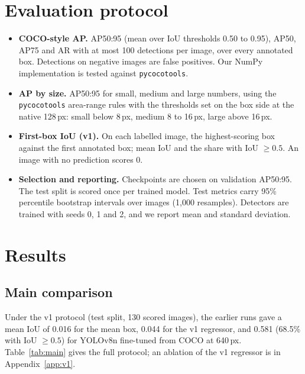 \documentclass[10pt,a4paper]{article}
\begin{document}
\section{Evaluation protocol}

\begin{itemize}
  \item \textbf{COCO-style AP.} AP50:95 (mean over IoU thresholds 0.50 to 0.95), AP50, AP75 and
    AR with at most 100 detections per image, over every annotated box. Detections on negative
    images are false positives. Our NumPy implementation is tested against \texttt{pycocotools}.
  \item \textbf{AP by size.} AP50:95 for small, medium and large numbers, using the
    \texttt{pycocotools} area-range rules with the thresholds set on the box side at the native
    128\,px: small below 8\,px, medium 8 to 16\,px, large above 16\,px.
  \item \textbf{First-box IoU (v1).} On each labelled image, the highest-scoring box against the
    first annotated box; mean IoU and the share with IoU $\geq 0.5$. An image with no prediction
    scores 0.
  \item \textbf{Selection and reporting.} Checkpoints are chosen on validation AP50:95. The test
    split is scored once per trained model. Test metrics carry 95\% percentile bootstrap
    intervals over images (1,000 resamples). Detectors are trained with seeds 0, 1 and 2, and we
    report mean and standard deviation.
\end{itemize}

\section{Results}

\subsection{Main comparison}

Under the v1 protocol (test split, 130 scored images), the earlier runs gave a mean IoU of 0.016
for the mean box, 0.044 for the v1 regressor, and 0.581 (68.5\% with IoU $\geq 0.5$) for YOLOv8n
fine-tuned from COCO at 640\,px. Table~\ref{tab:main} gives the full protocol; an ablation of the v1 regressor is in Appendix~\ref{app:v1}.
\end{document}
